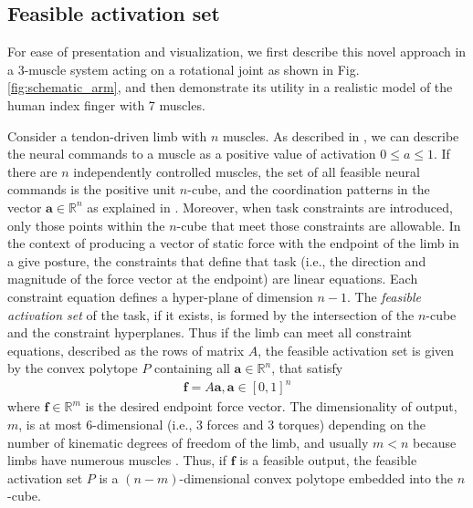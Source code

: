 \label{s:methods}
\subsection*{Feasible activation set}
For ease of presentation and visualization, we first describe this novel approach in a 3-muscle system acting on a  rotational joint as shown in Fig. \ref{fig:schematic_arm}, and then demonstrate its utility in a realistic model of the human index finger with 7 muscles. 

Consider a tendon-driven limb with $n$ muscles.
As described in \cite{Kuo1993Human, Chao1978Graphical,spoor1983balancing,Valero-Cuevas2009mathematical, valero-cuevas2015neuromechanics}, we can describe the neural commands to a muscle as a positive value of activation $0 \leq a \leq 1$.
If there are $n$ independently controlled  muscles,  the set of all feasible neural commands  is the positive unit $n$-cube, and the coordination patterns in the vector $\textbf{a} \in \mathbb{R}^n$ as explained in \cite{Valero-Cuevas2009mathematical, valero-cuevas2015fundamentals}.
Moreover, when task constraints are introduced, only those points within the $n$-cube that meet those constraints are allowable.
In the context of producing a vector of static force with the endpoint of the limb in a give posture, the constraints that define that task (i.e., the direction and magnitude of the force vector at the endpoint) are linear equations.  Each constraint equation defines a hyper-plane of dimension $n-1$.
The \emph{feasible activation set} of the task, if it exists, is formed by the intersection of the $n$-cube and the constraint hyperplanes.
Thus if the limb can meet all constraint equations, described as the rows of matrix $A$, the feasible activation set is given by the convex polytope $P$ containing all $\textbf{a} \in \mathbb{R}^n$, that satisfy
\begin{align}
\label{eq:constraints}
		\textbf{f} = A\textbf{a}, \textbf{a} \in [0,1]^n
\end{align}
where $\textbf{f} \in \mathbb{R}^m$ is the desired endpoint force vector.
The dimensionality of output, $m$, is  at most 6-dimensional (i.e., 3 forces and 3 torques) depending on the number of kinematic degrees of freedom of the limb, and usually $m < n$  because  limbs have numerous  muscles \cite{Valero-cuevas2015fundamentals}. Thus, if $\textbf{f}$ is a feasible  output, the feasible activation set $P$ is a $(n-m)$-dimensional convex polytope embedded into the $n$-cube.
